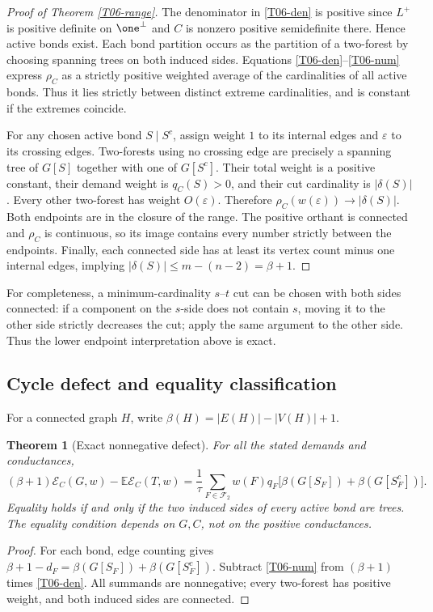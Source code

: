 \documentclass[11pt,a4paper]{article}
\newtheorem{theorem}{Theorem}[section]
\theoremstyle{definition}\newtheorem{definition}[theorem]{Definition}
\theoremstyle{remark}\newtheorem{remark}[theorem]{Remark}
\numberwithin{equation}{section}
\begin{document}
\begin{proof}[Proof of Theorem \ref{T06-range}]
The denominator in \eqref{T06-den} is positive since $L^+$ is positive definite on $\one^\perp$ and $C$ is nonzero positive semidefinite there. Hence active bonds exist. Each bond partition occurs as the partition of a two-forest by choosing spanning trees on both induced sides. Equations \eqref{T06-den}--\eqref{T06-num} express $\rho_C$ as a strictly positive weighted average of the cardinalities of all active bonds. Thus it lies strictly between distinct extreme cardinalities, and is constant if the extremes coincide.

For any chosen active bond $S\mid S^c$, assign weight $1$ to its internal edges and $\varepsilon$ to its crossing edges. Two-forests using no crossing edge are precisely a spanning tree of $G[S]$ together with one of $G[S^c]$. Their total weight is a positive constant, their demand weight is $q_C(S)>0$, and their cut cardinality is $|\delta(S)|$. Every other two-forest has weight $O(\varepsilon)$. Therefore $\rho_C(w(\varepsilon))\to|\delta(S)|$. Both endpoints are in the closure of the range. The positive orthant is connected and $\rho_C$ is continuous, so its image contains every number strictly between the endpoints. Finally, each connected side has at least its vertex count minus one internal edges, implying $|\delta(S)|\le m-(n-2)=\beta+1$.
\end{proof}
For completeness, a minimum-cardinality $s$--$t$ cut can be chosen with both sides connected: if a component on the $s$-side does not contain $s$, moving it to the other side strictly decreases the cut; apply the same argument to the other side. Thus the lower endpoint interpretation above is exact.

\subsection{Cycle defect and equality classification}\label{T06-sec-3}
For a connected graph $H$, write $\beta(H)=|E(H)|-|V(H)|+1$.
\begin{theorem}[Exact nonnegative defect]\label{T06-defect}
For all the stated demands and conductances,
\[
 (\beta+1)\mathcal E_C(G,w)-\mathbb E\mathcal E_C(T,w)
 =\frac1\tau\sum_{F\in\mathcal F_2}w(F)q_F
 \bigl[\beta(G[S_F])+\beta(G[S_F^c])\bigr].
\]
Equality holds if and only if the two induced sides of every active bond are trees. The equality condition depends on $G,C$, not on the positive conductances.
\end{theorem}
\begin{proof}
For each bond, edge counting gives
$\beta+1-d_F=\beta(G[S_F])+\beta(G[S_F^c])$.
Subtract \eqref{T06-num} from $(\beta+1)$ times \eqref{T06-den}. All summands are nonnegative; every two-forest has positive weight, and both induced sides are connected.
\end{proof}
\end{document}
